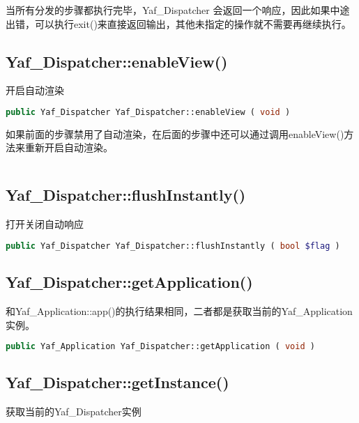 当所有分发的步骤都执行完毕，Yaf\_Dispatcher 会返回一个响应，因此如果中途出错，可以执行exit()来直接返回输出，其他未指定的操作就不需要再继续执行。





\subsection{Yaf\_Dispatcher::enableView()}

开启自动渲染


\begin{lstlisting}[language=PHP]
public Yaf_Dispatcher Yaf_Dispatcher::enableView ( void )
\end{lstlisting}

如果前面的步骤禁用了自动渲染，在后面的步骤中还可以通过调用enableView()方法来重新开启自动渲染。

\begin{lstlisting}[language=PHP]

\end{lstlisting}
\subsection{Yaf\_Dispatcher::flushInstantly()}

打开关闭自动响应

\begin{lstlisting}[language=PHP]
public Yaf_Dispatcher Yaf_Dispatcher::flushInstantly ( bool $flag )
\end{lstlisting}


\subsection{Yaf\_Dispatcher::getApplication()}

和Yaf\_Application::app()的执行结果相同，二者都是获取当前的Yaf\_Application实例。


\begin{lstlisting}[language=PHP]
public Yaf_Application Yaf_Dispatcher::getApplication ( void )
\end{lstlisting}






\subsection{Yaf\_Dispatcher::getInstance()}


获取当前的Yaf\_Dispatcher实例

